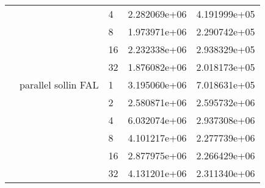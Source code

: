 \begin{tabular}{lllrr}
                                                       &                     & 4  &  2.282069e+06 &  4.191999e+05 \\
                                                       &                     & 8  &  1.973971e+06 &  2.290742e+05 \\
                                                       &                     & 16 &  2.232338e+06 &  2.938329e+05 \\
                                                       &                     & 32 &  1.876082e+06 &  2.018173e+05 \\
                                                       & parallel sollin FAL & 1  &  3.195060e+06 &  7.018631e+05 \\
                                                       &                     & 2  &  2.580871e+06 &  2.595732e+06 \\
                                                       &                     & 4  &  6.032074e+06 &  2.937308e+06 \\
                                                       &                     & 8  &  4.101217e+06 &  2.277739e+06 \\
                                                       &                     & 16 &  2.877975e+06 &  2.266429e+06 \\
                                                       &                     & 32 &  4.131201e+06 &  2.311340e+06 \\
\bottomrule
\end{tabular}
